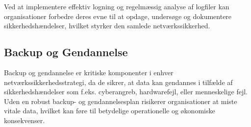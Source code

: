 \noindent
Ved at implementere effektiv logning og regelmæssig analyse af logfiler kan organisationer forbedre deres evne til at opdage, undersøge og dokumentere sikkerhedshændelser, hvilket styrker den samlede netværkssikkerhed.


\subsection{Backup og Gendannelse}
Backup og gendannelse er kritiske komponenter i enhver netværkssikkerhedsstrategi, da de sikrer, at data kan gendannes i tilfælde af sikkerhedshændelser som f.eks. cyberangreb, hardwarefejl, eller menneskelige fejl. Uden en robust backup- og gendannelsesplan risikerer organisationer at miste vitale data, hvilket kan føre til betydelige operationelle og økonomiske konsekvenser.

